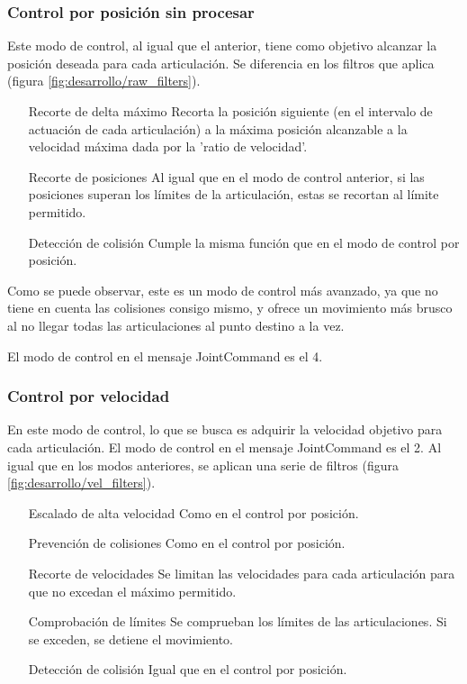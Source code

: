 \subsubsection{Control por posición sin procesar}
Este modo de control, al igual que el anterior, tiene como objetivo alcanzar la posición deseada para cada articulación. Se diferencia en los filtros que aplica (figura \ref{fig:desarrollo/raw_filters}).

\begin{enumerate}
\item [Recorte de delta máximo] Recorta la posición siguiente (en el intervalo de actuación de cada articulación) a la máxima posición alcanzable a la velocidad máxima dada por la 'ratio de velocidad'.
\item [Recorte de posiciones] Al igual que en el modo de control anterior, si las posiciones superan los límites de la articulación, estas se recortan al límite permitido.
\item [Detección de colisión] Cumple la misma función que en el modo de control por posición.
\end{enumerate}

Como se puede observar, este es un modo de control más avanzado, ya que no tiene en cuenta las colisiones consigo mismo, y ofrece un movimiento más brusco al no llegar todas las articulaciones al punto destino a la vez.

El modo de control en el mensaje JointCommand es el 4.

\subsubsection{Control por velocidad}
En este modo de control, lo que se busca es adquirir la velocidad objetivo para cada articulación. El modo de control en el mensaje JointCommand es el 2. Al igual que en los modos anteriores, se aplican una serie de filtros (figura \ref{fig:desarrollo/vel_filters}).

\begin{enumerate}
\item [Escalado de alta velocidad] Como en el control por posición.
\item [Prevención de colisiones] Como en el control por posición.
\item [Recorte de velocidades] Se limitan las velocidades para cada articulación para que no excedan el máximo permitido.
\item [Comprobación de límites] Se comprueban los límites de las articulaciones. Si se exceden, se detiene el movimiento.
\item [Detección de colisión] Igual que en el control por posición.
\end{enumerate}


